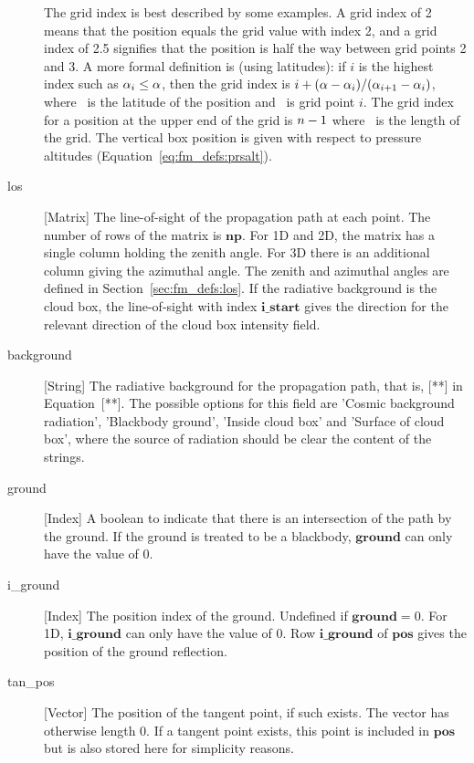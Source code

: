 \begin{description}
     The grid index is best described by some examples. A grid index of
     2 means that the position equals the grid value with index 2, and
     a grid index of 2.5 signifies that the position is half the way between
     grid points 2 and 3. A more formal definition is (using latitudes):
     if $i$ is the highest index such as $\alpha_{i}\leq\alpha$, then the grid
     index is $i+(\alpha-\alpha_{i})/(\alpha_{i+1}-\alpha_{i})$, where \Lat\ is the 
     latitude of the position and \ is grid point $i$. The grid index 
     for a position at the upper end of the grid is $n-1$ where
     \VctLng\ is the length of the grid. The vertical box position is given 
     with respect to pressure altitudes (Equation~\ref{eq:fm_defs:prsalt}).
  \item[los] [Matrix] The line-of-sight of the propagation path at each
     point. The number of rows of the matrix is $\mathbf{np}$. For 1D
     and 2D, the matrix has a single column holding the zenith angle. For 3D
     there is an additional column giving the azimuthal angle. The zenith and
     azimuthal angles are defined in Section~\ref{sec:fm_defs:los}.
     If the radiative background is the cloud box, the line-of-sight
     with index $\mathbf{i\_start}$
     gives the direction for the relevant direction of the cloud box intensity
     field.     
  \item[background] [String] The radiative background for the propagation path,
     that is, [**] in Equation~[**]. The possible options for this field
     are 'Cosmic background radiation', 'Blackbody ground', 'Inside cloud box'
     and 'Surface of cloud box', where the source of radiation should be clear
     the content of the strings.
  \item[ground] [Index] A boolean to indicate that there is an intersection
     of the path by the ground. If the ground is treated to be a blackbody,
     $\mathbf{ground}$ can only have the value of 0.
  \item[i\_ground] [Index] The position index of the ground. Undefined if 
     $\mathbf{ground}=0$. For 1D, $\mathbf{i\_ground}$ can only have the 
     value of 0. Row $\mathbf{i\_ground}$ of $\mathbf{pos}$ gives the 
     position of the ground reflection.
  \item[tan\_pos] [Vector] The position of the tangent point, if such exists.
     The vector has otherwise length 0. If a tangent point exists, this point
     is included in $\mathbf{pos}$ but is also stored here for simplicity
     reasons.
\end{description}



